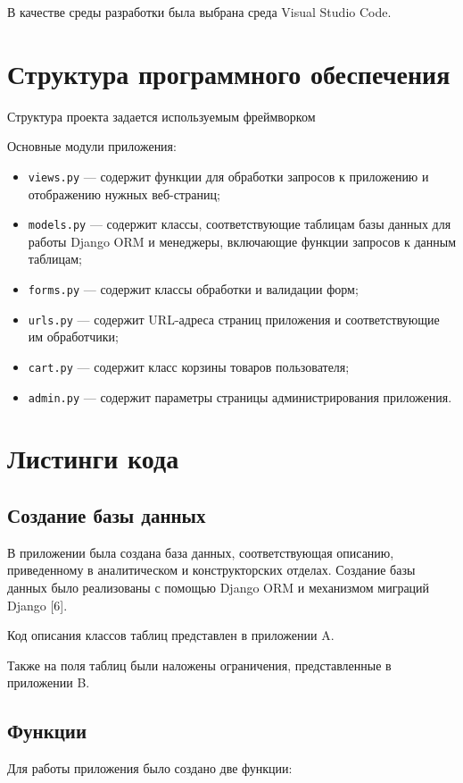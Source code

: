 В качестве среды разработки была выбрана среда Visual Studio Code.

\section{Структура программного обеспечения}
Структура проекта задается используемым фреймворком 

Основные модули приложения:
\begin{itemize}
	\item \verb;views.py; --- содержит функции для обработки запросов к приложению и отображению нужных веб-страниц;
	\item \verb;models.py; --- содержит классы, соответствующие таблицам базы данных для работы Django ORM и менеджеры, включающие функции запросов к данным таблицам;
	\item \verb;forms.py; --- содержит классы обработки и валидации форм;
	\item \verb;urls.py; --- содержит URL-адреса страниц приложения и соответствующие им обработчики;
	\item \verb;cart.py; --- содержит класс корзины товаров пользователя;
	\item \verb;admin.py; --- содержит параметры страницы администрирования приложения.
\end{itemize}

\section{Листинги кода}

\subsection{Создание базы данных}

В приложении была создана база данных, соответствующая описанию, приведенному в аналитическом и конструкторских отделах. Создание базы данных было реализованы с помощью Django ORM и механизмом миграций Django [6].

Код описания классов таблиц представлен в приложении A.

Также на поля таблиц были наложены ограничения, представленные в приложении B.

\subsection{Функции}

Для работы приложения было создано две функции:

